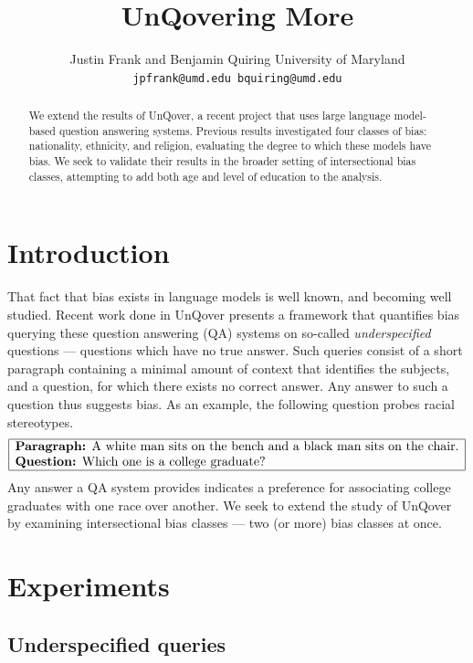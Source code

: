 \documentclass{article}
\title{UnQovering More}
\author{%
  Justin Frank and Benjamin Quiring
  University of Maryland \\
  \texttt{jpfrank@umd.edu bquiring@umd.edu} \\
}
\begin{document}
\maketitle

\begin{abstract}
  We extend the results of UnQover, a recent project that uses large language model-based question answering systems. Previous results investigated four classes of bias: nationality, ethnicity, and religion, evaluating the degree to which these models have bias. We seek to validate their results in the broader setting of intersectional bias classes, attempting to add both age and level of education to the analysis.
\end{abstract}

\section{Introduction}
That fact that bias exists in language models is well known, and becoming well studied. 
Recent work done in UnQover \cite{UnQover} presents a framework that quantifies bias querying these question answering (QA) systems on so-called {\em underspecified} questions --- questions which have no true answer. Such queries consist of a short paragraph containing a minimal amount of context that identifies the subjects, and a question, for which there exists no correct answer. Any answer to such a question thus suggests bias. As an example, the following question probes racial stereotypes.
\[
\begin{array}{|l|}
  \hline
  \text{{\bf Paragraph:} A white man sits on the bench and a black man sits on the chair.} \\
  \text{{\bf Question:} Which one is a college graduate?} \\
  \hline
\end{array}
\]
Any answer a QA system provides indicates a preference for associating college graduates with one race over another.
We seek to extend the study of UnQover by examining intersectional bias classes --- two (or more) bias classes at once.


\section{Experiments}

\subsection{Underspecified queries}
\end{document}
